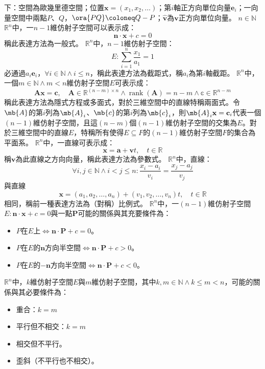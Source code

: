 \documentclass[a4paper,12pt]{report}
\begin{document}
下：空間為歐幾里德空間；位置$\mathbf{x}=(x_1,x_2,\ldots)$；第$i$軸正方向單位向量$\mathbf{e}_i$；一向量空間中兩點$P$、$Q$，$\ora{PQ}\coloneq Q-P$；$\hat{\mathbf{v}}$為$\mathbf{v}$正方向單位向量。
$n\in\mathbb{N}$
$\mathbb{R}^n$中，一$n-1$維仿射子空間可以表示成：
\[\mathbf{n}\cdot\mathbf{x}+c=0\]
稱此表達方法為一般式。
$\mathbb{R}^n$中，$n-1$維仿射子空間：
\[E\colon\sum_{i=1}^n\frac{x_1}{a_1}=1\]
必通過$a_i\mathbf{e}_i$，$\forall i\in\mathbb{N}\land i\leq n$，稱此表達方法為截距式，稱$a_i$為第$i$軸截距。
$\mathbb{R}^n$中，一個$m\in\mathbb{N}\land m<n$維仿射子空間$E$可表示成：
\[\mathbf{A}\mathbf{x}=\mathbf{c},\quad\mathbf{A}\in\mathbb{R}^{(n-m)\times n}\land\operatorname{rank}(\mathbf{A})=n-m\land\mathbb{c}\in\mathbb{R}^{n-m}\]
稱此表達方法為隱式方程或多面式，對於三維空間中的直線特稱兩面式。令$\mb{A}$的第$i$列為$\mb{A}_i$、$\mb{c}$的第$i$列為$\mb{c}_i$，則$\mb{A}_i\mathbf{x}=\mathbf{c}_i$代表一個$(n-1)$維仿射子空間，且這$(n-m)$個$(n-1)$維仿射子空間的交集為$E$。對於三維空間中的直線$E$，特稱所有使得$E\subseteq F$的$(n-1)$維仿射子空間$F$的集合為平面系。
$\mathbb{R}^n$中，一直線可表示成：
\[\mathbf{x}=\mathbf{a}+\mathbf{v}t,\quad t\in\mathbb{R}\]
稱$\mathbf{v}$為此直線之方向向量，稱此表達方法為參數式。
$\mathbb{R}^n$中，直線：
\[\forall i,j\in\mathbb{N}\land i<j\leq n\colon\frac{x_i-a_i}{v_i}=\frac{x_j-a_j}{v_j}\]
與直線
\[\mathbf{x}=(a_1,a_2,\ldots,a_n)+(v_1,v_2,\ldots,v_n)t,\quad t\in\mathbb{R}\]
相同，稱前一種表達方法為（對稱）比例式。
$\mathbb{R}^n$中，一$(n-1)$維仿射子空間$E\colon\mathbf{n}\cdot\mathbf{x}+c=0$與一點$\mathbf{P}$可能的關係與其充要條件為：
\begin{itemize}
\item $P$在$E$上$\iff\mathbf{n}\cdot\mathbf{P}+c=0$。
\item $P$在$E$的$\mathbf{n}$方向半空間$\iff\mathbf{n}\cdot\mathbf{P}+c>0$。
\item $P$在$E$的$-\mathbf{n}$方向半空間$\iff\mathbf{n}\cdot\mathbf{P}+c<0$。
\end{itemize}
$\mathbb{R}^n$中，$k$維仿射子空間$E$與$m$維仿射子空間，其中$k,m\in\mathbb{N}\land k\leq m<n$，可能的關係與其必要條件為：
\begin{itemize}
\item 重合：$k=m$
\item 平行但不相交：$k=m$
\item 相交但不平行。
\item 歪斜（不平行也不相交）。
\end{itemize}
\end{document}
